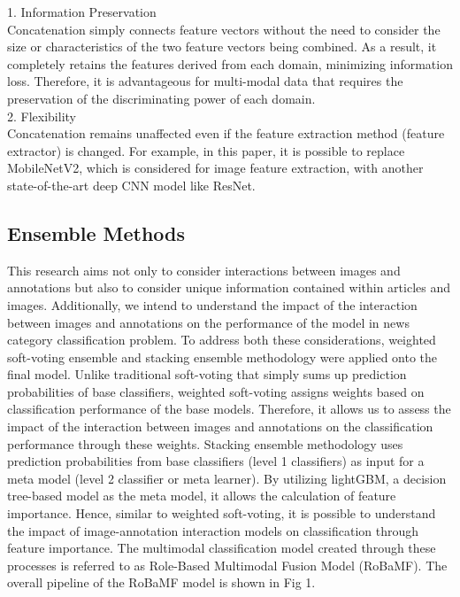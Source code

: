 \documentclass{article}
\begin{document}
1. Information Preservation\\
Concatenation simply connects feature vectors without the need to consider the size or characteristics of the two feature vectors being combined. As a result, it completely retains the features derived from each domain, minimizing information loss. Therefore, it is advantageous for multi-modal data that requires the preservation of the discriminating power of each domain.\\

2. Flexibility\\
Concatenation remains unaffected even if the feature extraction method (feature extractor) is changed. For example, in this paper, it is possible to replace MobileNetV2, which is considered for image feature extraction, with another state-of-the-art deep CNN model like ResNet.\\


\subsection{Ensemble Methods}
This research aims not only to consider interactions between images and annotations but also to consider unique information contained within articles and images.
Additionally, we intend to understand the impact of the interaction between images and annotations on the performance of the model in news category classification problem.
To address both these considerations, weighted soft-voting ensemble and stacking ensemble methodology were applied onto the final model.
Unlike traditional soft-voting that simply sums up prediction probabilities of base classifiers, weighted soft-voting assigns weights based on classification performance of the base models.
Therefore, it allows us to assess the impact of the interaction between images and annotations on the classification performance through these weights.
Stacking ensemble methodology uses prediction probabilities from base classifiers (level 1 classifiers) as input for a meta model (level 2 classifier or meta learner). By utilizing lightGBM, a decision tree-based model as the meta model, it allows the calculation of feature importance. Hence, similar to weighted soft-voting, it is possible to understand the impact of image-annotation interaction models on classification through feature importance.
The multimodal classification model created through these processes is referred to as Role-Based Multimodal Fusion Model (RoBaMF). The overall pipeline of the RoBaMF model is shown in Fig 1.
\end{document}
